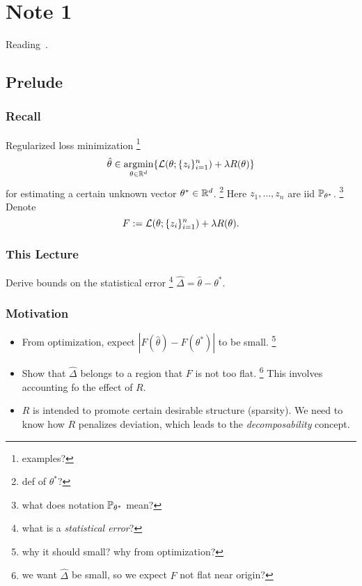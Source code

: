 \section{Note 1}
Reading~\cite{negahban2012}.
\subsection{Prelude}

\subsubsection{Recall}

Regularized loss minimization
\footnote{examples?}
\begin{equation}
\hat\theta \in \mathop{\mathrm{argmin}}_{\theta\in{\mathbb{R}}^d} \{\mathcal{L}(\theta;\{z_i\}_{i=1}^n) + \lambda R(\theta)\}
\end{equation}
for estimating a certain unknown vector $\theta^*\in{\mathbb{R}}^d$.
\footnote{def of $\theta^*$?}
Here $z_1,\dots,z_n$ are iid \wrt $\mathbb{P}_{\theta^*}$.
\footnote{what does notation $\mathbb{P}_{\theta^*}$ mean?}
Denote
\begin{equation}
F := \mathcal{L}(\theta;\{z_i\}_{i=1}^n) + \lambda R(\theta).
\end{equation}

\subsubsection{This Lecture}

Derive bounds on the statistical error
\footnote{what is a \emph{statistical error}?}
$\hat\Delta = \hat\theta - \theta^*$.

\subsubsection{Motivation}

\begin{itemize}
    \item From optimization, expect
        $|F(\hat\theta) - F(\theta^*)|$
        to be small.
        \footnote{why it should small? why from optimization?}
    \item Show that $\hat\Delta$ belongs to a region
        that $F$ is not too flat.
        \footnote{we want $\hat\Delta$ be small,
        so we expect $F$ not flat near origin?}
        This involves accounting fo the effect of $R$.
    \item $R$ is intended to promote certain desirable structure (\eg sparsity).
        We need to know how $R$ penalizes deviation,
        which leads to the \emph{decomposability} concept.
\end{itemize}


